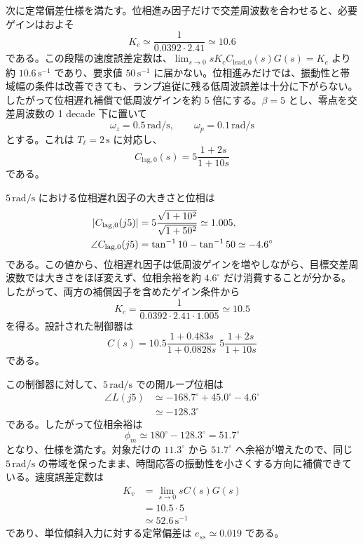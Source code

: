 \begin{example}[遅れ進み補償器による周波数仕様設計]
次に定常偏差仕様を満たす。位相進み因子だけで交差周波数を合わせると、必要ゲインはおよそ
\begin{equation}
  K_c\simeq
  \frac{1}{0.0392\cdot2.41}
  \simeq 10.6
\end{equation}
である。この段階の速度誤差定数は、$\lim_{s\to0}sK_cC_{\mathrm{lead},0}(s)G(s)=K_c$ より約 $10.6\,\mathrm{s^{-1}}$ であり、要求値 $50\,\mathrm{s^{-1}}$ に届かない。位相進みだけでは、振動性と帯域幅の条件は改善できても、ランプ追従に残る低周波誤差は十分に下がらない。したがって位相遅れ補償で低周波ゲインを約 5 倍にする。$\beta=5$ とし、零点を交差周波数の 1 decade 下に置いて
\begin{equation}
  \omega_z=0.5\,\mathrm{rad/s},
  \qquad
  \omega_p=0.1\,\mathrm{rad/s}
\end{equation}
とする。これは $T_\ell=2\,\mathrm{s}$ に対応し、
\begin{equation}
  C_{\mathrm{lag},0}(s)
  =5\frac{1+2s}{1+10s}
\end{equation}
である。

$5\,\mathrm{rad/s}$ における位相遅れ因子の大きさと位相は
\begin{align}
  \left|C_{\mathrm{lag},0}(j5)\right|
  &=5\frac{\sqrt{1+10^2}}{\sqrt{1+50^2}}
    \simeq 1.005,\\
  \angle C_{\mathrm{lag},0}(j5)
  &=\tan^{-1}10-\tan^{-1}50
    \simeq -4.6^\circ
\end{align}
である。この値から、位相遅れ因子は低周波ゲインを増やしながら、目標交差周波数では大きさをほぼ変えず、位相余裕を約 $4.6^\circ$ だけ消費することが分かる。したがって、両方の補償因子を含めたゲイン条件から
\begin{equation}
  K_c=
  \frac{1}
  {0.0392\cdot2.41\cdot1.005}
  \simeq 10.5
\end{equation}
を得る。設計された制御器は
\begin{equation}
  C(s)=10.5
  \frac{1+0.483s}{1+0.0828s}
  \;5\frac{1+2s}{1+10s}
\end{equation}
である。

この制御器に対して、$5\,\mathrm{rad/s}$ での開ループ位相は
\begin{align}
  \angle L(j5)
  &\simeq -168.7^\circ+45.0^\circ-4.6^\circ\\
  &\simeq -128.3^\circ
\end{align}
である。したがって位相余裕は
\begin{equation}
  \phi_m\simeq 180^\circ-128.3^\circ=51.7^\circ
\end{equation}
となり、仕様を満たす。対象だけの $11.3^\circ$ から $51.7^\circ$ へ余裕が増えたので、同じ $5\,\mathrm{rad/s}$ の帯域を保ったまま、時間応答の振動性を小さくする方向に補償できている。速度誤差定数は
\begin{align}
  K_v
  &=\lim_{s\to0}sC(s)G(s)\\
  &=10.5\cdot5\\
  &\simeq52.6\,\mathrm{s^{-1}}
\end{align}
であり、単位傾斜入力に対する定常偏差は $e_{ss}\simeq0.019$ である。


\end{example}
